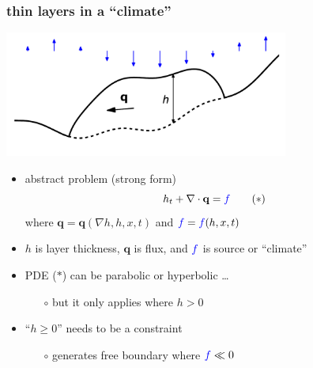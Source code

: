 \documentclass[hide notes,intlimits]{beamer}
\newcommand{\bq}{\mathbf{q}}
\newcommand{\Div}{\nabla\cdot}
\newcommand{\grad}{\nabla}
\begin{document}
\begin{frame}
  \frametitle{thin layers in a ``climate''}
\begin{center}
\includegraphics[width=0.7\textwidth,keepaspectratio=true]{cartoon-wclimate}
\end{center}
\vspace{-6mm}
\begin{itemize}
\item abstract problem (strong form)
  \begin{equation}
  h_t + \Div \bq = {\color{blue} f} \tag{$\ast$}
  \end{equation}
where $\bq=\bq(\grad h, h, x, t)$ and ${\color{blue} f}={\color{blue} f}(h,x,t)$
\item $h$ is layer thickness, $\bq$ is flux, and ${\color{blue} f}$ is source or ``climate''
\item PDE ($\ast$) can be parabolic or hyperbolic \dots
  \begin{itemize}
  \item[$\circ$] but it only applies where $h>0$
  \end{itemize}
\item ``$h\ge 0$'' needs to be a constraint
  \begin{itemize}
  \item[$\circ$] generates free boundary where ${\color{blue} f} \ll 0$
  \end{itemize}
\end{itemize}
\end{frame}
\end{document}

